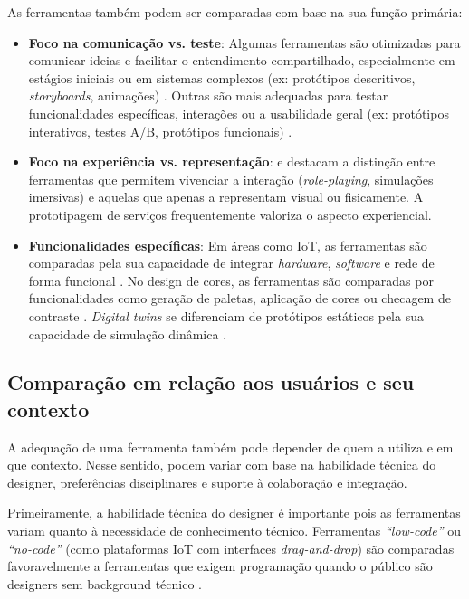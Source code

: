 As ferramentas também podem ser comparadas com base na sua função primária:

\begin{itemize}
	\item \textbf{Foco na comunicação vs. teste}: Algumas ferramentas são otimizadas para comunicar ideias e facilitar o entendimento compartilhado, especialmente em estágios iniciais ou em sistemas complexos (ex: protótipos descritivos, \textit{storyboards}, animações) \cite{wang2023smartproducts, lee2023industry, paust2025integrative}. Outras são mais adequadas para testar funcionalidades específicas, interações ou a usabilidade geral (ex: protótipos interativos, testes A/B, protótipos funcionais) \cite{villa2022integratedcare, asbjornsen2022echange, Kim2024}.
	
	\item \textbf{Foco na experiência vs. representação}:  e  destacam a distinção entre ferramentas que permitem vivenciar a interação (\textit{role-playing}, simulações imersivas) e aquelas que apenas a representam visual ou fisicamente. A prototipagem de serviços frequentemente valoriza o aspecto experiencial.
	
	\item \textbf{Funcionalidades específicas}: Em áreas como IoT, as ferramentas são comparadas pela sua capacidade de integrar \textit{hardware}, \textit{software} e rede de forma funcional \cite{Kim2024}. No design de cores, as ferramentas são comparadas por funcionalidades como geração de paletas, aplicação de cores ou checagem de contraste \cite{hegemann2024palette}. \textit{Digital twins} se diferenciam de protótipos estáticos pela sua capacidade de simulação dinâmica \cite{mager2023product}.
	
\end{itemize}

\subsection{Comparação em relação aos usuários e seu contexto}

A adequação de uma ferramenta também pode depender de quem a utiliza e em que contexto. Nesse sentido, podem variar com base na habilidade técnica do designer, preferências disciplinares e suporte à colaboração e integração.

Primeiramente, a habilidade técnica do designer é importante pois as ferramentas variam quanto à necessidade de conhecimento técnico. Ferramentas \textit{``low-code''} ou \textit{``no-code''} (como plataformas IoT com interfaces \textit{drag-and-drop}) são comparadas favoravelmente a ferramentas que exigem programação quando o público são designers sem background técnico \cite{Kim2024}.

